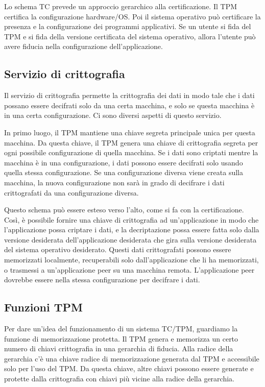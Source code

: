 \singlespacing

Lo schema TC prevede un approccio gerarchico alla certificazione. Il TPM certifica la configurazione hardware/OS. Poi il sistema operativo può certificare la presenza e la configurazione dei programmi applicativi. Se un utente si fida del TPM e si fida della versione certificata del sistema operativo, allora l'utente può avere fiducia nella configurazione dell'applicazione.
\subsection{Servizio di crittografia}
Il servizio di crittografia permette la crittografia dei dati in modo tale che i dati possano essere decifrati solo da una certa macchina, e solo se questa macchina è in una certa configurazione. Ci sono diversi aspetti di questo servizio.

\singlespacing

In primo luogo, il TPM mantiene una chiave segreta principale unica per questa macchina. Da questa chiave, il TPM genera una chiave di crittografia segreta per ogni possibile configurazione di quella macchina. Se i dati sono criptati mentre la macchina è in una configurazione, i dati possono essere decifrati solo usando quella stessa configurazione. Se una configurazione diversa viene creata sulla macchina, la nuova configurazione non sarà in grado di decifrare i dati crittografati da una configurazione diversa.

\singlespacing

Questo schema può essere esteso verso l'alto, come si fa con la certificazione. Così, è possibile fornire una chiave di crittografia ad un'applicazione in modo che l'applicazione possa criptare i dati, e la decriptazione possa essere fatta solo dalla versione desiderata dell'applicazione desiderata che gira sulla versione desiderata del sistema operativo desiderato. Questi dati crittografati possono essere memorizzati localmente, recuperabili solo dall'applicazione che li ha memorizzati, o trasmessi a un'applicazione peer su una macchina remota. L'applicazione peer dovrebbe essere nella stessa configurazione per decifrare i dati.
\newpage
\subsection{Funzioni TPM}
Per dare un'idea del funzionamento di un sistema TC/TPM, guardiamo la funzione di memorizzazione protetta. Il TPM genera e memorizza un certo numero di chiavi crittografia in una gerarchia di fiducia. Alla radice della gerarchia c'è una chiave radice di memorizzazione generata dal TPM e accessibile solo per l'uso del TPM. Da questa chiave, altre chiavi possono essere generate e protette dalla crittografia con chiavi più vicine alla radice della gerarchia.

